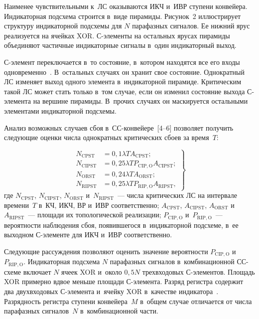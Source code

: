 \begin{multicols}{2}
  Наименее чувствительными к~ЛС оказываются ИКЧ и~ИВР ступени 
конвейера. Индикаторная подсхема строится в~виде пирамиды. Рисунок~2 
иллюстрирует структуру индикаторной подсхемы для $N$ парафазных 
сигналов. Ее нижний ярус реализуется на ячейках XOR. С-эле\-мен\-ты на 
остальных ярусах пирамиды объединяют частичные индикаторные сигналы 
в~один индикаторный выход.
  

   
  С-элемент переключается в~то состояние, в~котором находятся все его входы 
одновременно~\cite{7-sok}. В~остальных случаях он хранит свое состояние. 
Однократный ЛС изменяет выход одного элемента в~индикаторной пирамиде. 
Критическим такой ЛС может стать только в~том случае, если он изменил 
состояние выхода С-эле\-мен\-та на вершине пирамиды. В~прочих случаях он 
маскируется остальными элементами индикаторной подсхемы.
  
  Анализ возможных случаев сбоя в~СС-кон\-вей\-ере~[4--6] позволяет 
получить следующие оценки  числа однократных критических сбоев за 
время~$T$:

\noindent
  \begin{equation}
  \left.
  \begin{array}{rl}
     N_{\mathrm{CPST}} & = 0{,}1\lambda T A_{\mathrm{CPST}};\\[6pt]
     N_{\mathrm{CIPST}} &= 0{,}25\lambda TP_{\mathrm{CIP},\mathrm{O}} A_{\mathrm{CIPST}};\\[6pt]
 N_{\mathrm{ORST}} & = 0{,}24\lambda TA_{\mathrm{ORST}};\\[6pt]
N_{\mathrm{RIPST}}  &= 0{,}25\lambda TP_{\mathrm{RIP,O}}A_{\mathrm{RIPST}},
\end{array}
\right\}
\label{e1-sok}
\end{equation}
где $N_{\mathrm{CPST}}$, $N_{\mathrm{CIPST}}$, $N_{\mathrm{ORST}}$ и~$N_{\mathrm{RIPST}}$~--- числа критических ЛС на 
интервале времени~$T$ в~КЧ, ИКЧ, ВР и~ИВР соответственно; $A_{\mathrm{CPST}}$, 
$A_{\mathrm{CIPST}}$, $A_{\mathrm{ORST}}$ и~$A_{\mathrm{RIPST}}$~--- площади их топологической реализации; 
$P_{\mathrm{CIP,O}}$ и~$P_{\mathrm{RIP,O}}$~--- вероятности наблюдения сбоя, появившегося 
в~индикаторной подсхеме, в~ее выходном  
С-эле\-мен\-те для ИКЧ и~ИВР соответственно. 

  Следующие рассуждения позволяют оценить значение вероятности 
$P_{\mathrm{CIP,O}}$ и~$P_{\mathrm{RIP,O}}$. Индикаторная подсхема $N$ парафазных сигналов 
в~комбинационной СС-схе\-ме включает $N$ ячеек XOR и~около $0{,}5N$ 
трехвходовых С-эле\-мен\-тов. Площадь XOR примерно вдвое меньше площади  
С-эле\-мен\-та. Разряд регистра содержит два двухвходовых С-эле\-мен\-та 
и~ячейку XOR в~качестве индикатора~\cite{5-sok}. Разрядность регистра 
ступени конвейера~$M$ в~общем случае отличается от числа парафазных 
сигналов~$N$ в~комбинационной части.
  

\end{multicols}
